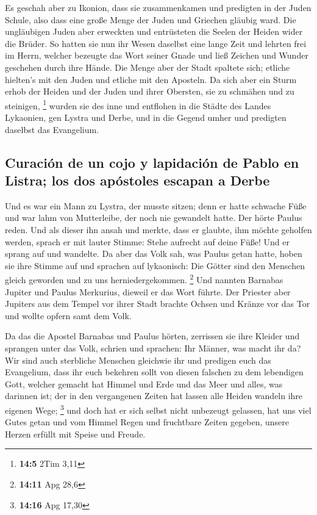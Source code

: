  Es geschah aber zu Ikonion, dass sie zusammenkamen und
predigten in der Juden Schule, also dass eine große Menge der Juden und
Griechen gläubig ward.  Die ungläubigen Juden aber
erweckten und entrüsteten die Seelen der Heiden wider die Brüder.
 So hatten sie nun ihr Wesen daselbst eine lange Zeit und
lehrten frei im Herrn, welcher bezeugte das Wort seiner Gnade und ließ
Zeichen und Wunder geschehen durch ihre Hände.  Die Menge
aber der Stadt spaltete sich; etliche hielten's mit den Juden und
etliche mit den Aposteln.  Da sich aber ein Sturm erhob
der Heiden und der Juden und ihrer Obersten, sie zu schmähen und zu
steinigen, \footnote{\textbf{14:5} 2Tim 3,11}  wurden sie
des inne und entflohen in die Städte des Landes Lykaonien, gen Lystra
und Derbe, und in die Gegend umher  und predigten daselbst
das Evangelium.

\hypertarget{curaciuxf3n-de-un-cojo-y-lapidaciuxf3n-de-pablo-en-listra-los-dos-apuxf3stoles-escapan-a-derbe}{%
\subsection{Curación de un cojo y lapidación de Pablo en Listra; los dos
apóstoles escapan a
Derbe}\label{curaciuxf3n-de-un-cojo-y-lapidaciuxf3n-de-pablo-en-listra-los-dos-apuxf3stoles-escapan-a-derbe}}

 Und es war ein Mann zu Lystra, der musste sitzen; denn er
hatte schwache Füße und war lahm von Mutterleibe, der noch nie gewandelt
hatte.  Der hörte Paulus reden. Und als dieser ihn ansah
und merkte, dass er glaubte, ihm möchte geholfen werden, 
sprach er mit lauter Stimme: Stehe aufrecht auf deine Füße! Und er
sprang auf und wandelte.  Da aber das Volk sah, was
Paulus getan hatte, hoben sie ihre Stimme auf und sprachen auf
lykaonisch: Die Götter sind den Menschen gleich geworden und zu uns
herniedergekommen. \footnote{\textbf{14:11} Apg 28,6} 
Und nannten Barnabas Jupiter und Paulus Merkurius, dieweil er das Wort
führte.  Der Priester aber Jupiters aus dem Tempel vor
ihrer Stadt brachte Ochsen und Kränze vor das Tor und wollte opfern samt
dem Volk.

 Da das die Apostel Barnabas und Paulus hörten, zerrissen
sie ihre Kleider und sprangen unter das Volk, schrien 
und sprachen: Ihr Männer, was macht ihr da? Wir sind auch sterbliche
Menschen gleichwie ihr und predigen euch das Evangelium, dass ihr euch
bekehren sollt von diesen falschen zu dem lebendigen Gott, welcher
gemacht hat Himmel und Erde und das Meer und alles, was darinnen ist;
 der in den vergangenen Zeiten hat lassen alle Heiden
wandeln ihre eigenen Wege; \footnote{\textbf{14:16} Apg 17,30}
 und doch hat er sich selbst nicht unbezeugt gelassen,
hat uns viel Gutes getan und vom Himmel Regen und fruchtbare Zeiten
gegeben, unsere Herzen erfüllt mit Speise und Freude.

